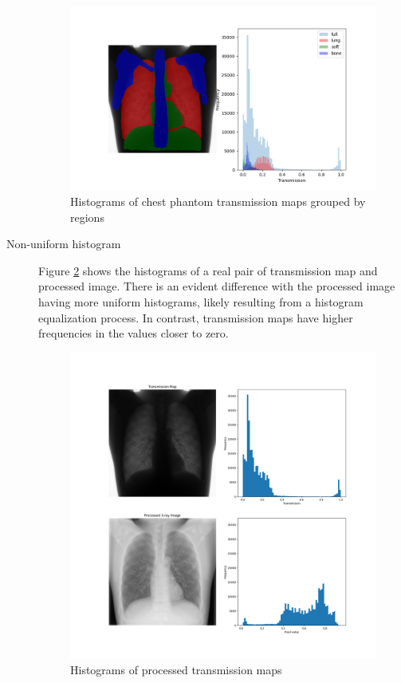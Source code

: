 \documentclass[nomenclature, english, bibtex]{kththesis}
\numberwithin{listing}{chapter}
\begin{document}
\begin{description}
    \begin{figure}
        \centering
        \includegraphics[width=1.0\textwidth]{figures/segmentation_txm_histograms.png}
        \caption{Histograms of chest phantom transmission maps grouped by regions}
        \label{fig:segmentationTransmissionMapsHistograms}
    \end{figure}

    \item[Non-uniform histogram] Figure \ref{fig:processedHistogramCompare} shows the histograms of a real pair of transmission map
    and processed image. There is an evident difference with the processed image having more uniform histograms,
    likely resulting from a histogram equalization process. In contrast, transmission maps have higher frequencies
    in the values closer to zero.
    \begin{figure}
        \centering
        \includegraphics[width=1.0\textwidth]{figures/processed_hist_cmp.png}
        \caption{Histograms of processed transmission maps}
        \label{fig:processedHistogramCompare}
    \end{figure}
\end{description}
\end{document}
